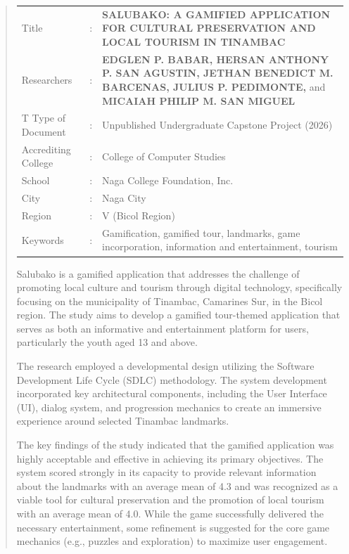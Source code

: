\documentclass[11pt]{research}
\begin{document}
\begin{abstract}
 \begin{center}
  \begin{tabular}{p{3.5cm}cp{9cm}}
     Title & : & \textbf{SALUBAKO: A GAMIFIED APPLICATION FOR CULTURAL PRESERVATION AND LOCAL TOURISM IN TINAMBAC} \\[1em]

     Researchers & : & \textbf{EDGLEN P. BABAR, HERSAN ANTHONY P. SAN AGUSTIN, JETHAN BENEDICT M. BARCENAS, JULIUS P. PEDIMONTE,} and \textbf{MICAIAH PHILIP M. SAN MIGUEL} \\[1em]

T    Type of Document & : & Unpublished Undergraduate Capstone Project (2026) \\[1em]

     Accrediting College & : & College of Computer Studies \\[1em]

     School & : & Naga College Foundation, Inc. \\[1em]

     City & : & Naga City \\[1em]

Region & : & V (Bicol Region) \\[1em]

Keywords & : & Gamification, gamified tour, landmarks, game incorporation, information and entertainment, tourism \\
\end{tabular}
\end{center}

Salubako is a gamified application that addresses the challenge of promoting local culture and tourism through digital technology, specifically focusing on the municipality of Tinambac, Camarines Sur, in the Bicol region. The study aims to develop a gamified tour-themed application that serves as both an informative and entertainment platform for users, particularly the youth aged 13 and above.

The research employed a developmental design utilizing the Software Development Life Cycle (SDLC) methodology. The system development incorporated key architectural components, including the User Interface (UI), dialog system, and progression mechanics to create an immersive experience around selected Tinambac landmarks.

The key findings of the study indicated that the gamified application was highly acceptable and effective in achieving its primary objectives. The system scored strongly in its capacity to provide relevant information about the landmarks with an average mean of 4.3 and was recognized as a viable tool for cultural preservation and the promotion of local tourism with an average mean of 4.0. While the game successfully delivered the necessary entertainment, some refinement is suggested for the core game mechanics (e.g., puzzles and exploration) to maximize user engagement. 


\end{abstract}
\end{document}

